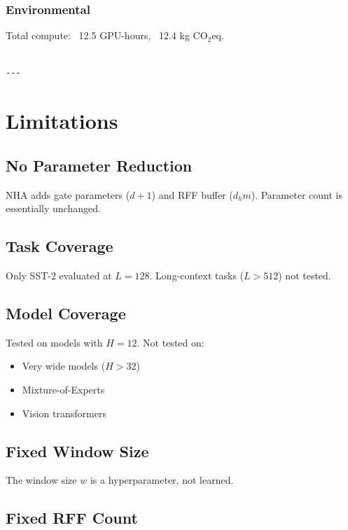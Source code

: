 \subsubsection{Environmental}
Total compute: ~12.5 GPU-hours, ~12.4 kg CO$_2$eq.
\begin{lstlisting}

---
\end{lstlisting}


\section{Limitations}

\subsection{No Parameter Reduction}

NHA adds gate parameters ($d + 1$) and RFF buffer ($d_h m$). Parameter 
count is essentially unchanged.

\subsection{Task Coverage}

Only SST-2 evaluated at $L = 128$. Long-context tasks ($L > 512$) not tested.

\subsection{Model Coverage}

Tested on models with $H = 12$. Not tested on:
\begin{itemize}
\item Very wide models ($H > 32$)
\item Mixture-of-Experts
\item Vision transformers

\end{itemize}
\subsection{Fixed Window Size}

The window size $w$ is a hyperparameter, not learned.

\subsection{Fixed RFF Count}

